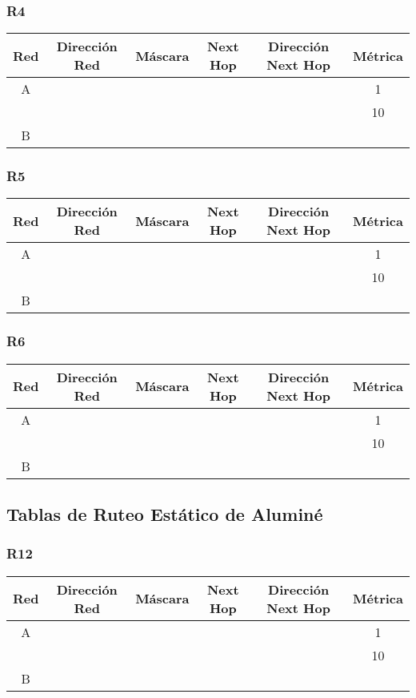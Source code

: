 \documentclass[12pt,a4paper,spanish]{article}
\begin{document}
\subsubsection{R4}
\begin{tabular}{|c|c|c|c|c|c|}
	\hline
	Red & Dirección Red & Máscara & Next Hop & Dirección Next Hop & Métrica \\
	\hline
	\hline
	A &  &  &  &  & 1\\
 	  &  &  &  &  & 10 \\
	\hline	
	B & & & & &\\
	\hline
\end{tabular}

\subsubsection{R5}
\begin{tabular}{|c|c|c|c|c|c|}
	\hline
	Red & Dirección Red & Máscara & Next Hop & Dirección Next Hop & Métrica \\
	\hline
	\hline
	A &  &  &  &  & 1\\
 	  &  &  &  &  & 10 \\
	\hline	
	B & & & & &\\
	\hline
\end{tabular}

\subsubsection{R6}
\begin{tabular}{|c|c|c|c|c|c|}
	\hline
	Red & Dirección Red & Máscara & Next Hop & Dirección Next Hop & Métrica \\
	\hline
	\hline
	A &  &  &  &  & 1\\
 	  &  &  &  &  & 10 \\
	\hline	
	B & & & & &\\
	\hline
\end{tabular}


\subsection{Tablas de Ruteo Estático de Aluminé}

\subsubsection{R12}
\begin{tabular}{|c|c|c|c|c|c|}
	\hline
	Red & Dirección Red & Máscara & Next Hop & Dirección Next Hop & Métrica \\
	\hline
	\hline
	A &  &  &  &  & 1\\
 	  &  &  &  &  & 10 \\
	\hline	
	B & & & & &\\
\end{tabular}
\end{document}
